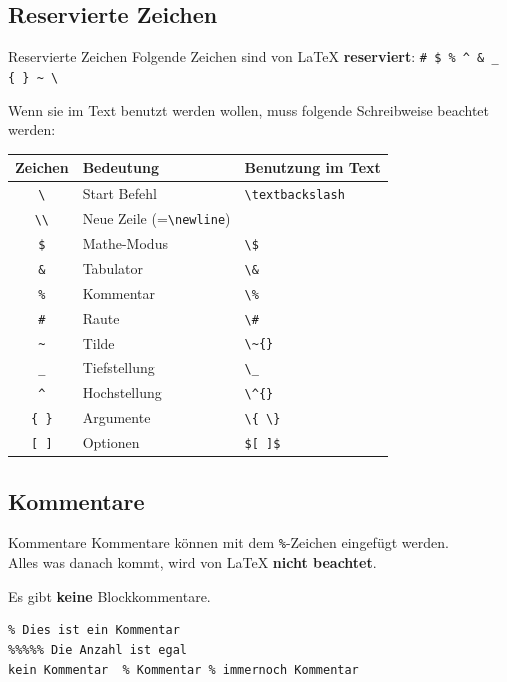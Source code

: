 \documentclass[xcolor=dvipsnames]{beamer}
\begin{document}
\subsection{Reservierte Zeichen} \label{sub:reserved}
\begin{frame}[fragile]{Reservierte Zeichen}
Folgende Zeichen sind von \LaTeX{} \textbf{reserviert}: \texttt{\# \$ \% \^{} \& \_ \{ \} \~{} \textbackslash{}} \par\medskip
Wenn sie im Text benutzt werden wollen, muss folgende Schreibweise beachtet werden: \par\medskip
{\footnotesize
\begin{tabular}{|c|l|l|}
\hline
Zeichen & Bedeutung & Benutzung im Text \\
\hline
\texttt{\textbackslash} & Start Befehl & \verb|\textbackslash| \\
\texttt{\textbackslash\textbackslash} & Neue Zeile (=\verb|\newline|) & \\
\texttt{\$} & Mathe-Modus & \verb|\$| \\
\texttt{\&} & Tabulator & \verb|\&| \\
\texttt{\%} & Kommentar & \verb|\%| \\
\texttt{\#} & Raute & \verb|\#| \\
\texttt{\~{}} & Tilde & \verb|\~{}| \\
\texttt{\_} & Tiefstellung & \verb|\_| \\
\texttt{\^{}} & Hochstellung & \verb|\^{}| \\
\texttt{\{ \}} & Argumente & \verb|\{ \}| \\
\texttt{[ ]} & Optionen & \verb|$[ ]$| \\ \hline
\end{tabular} 
}
\end{frame}


\subsection{Kommentare}
\begin{frame}[fragile]{Kommentare}
Kommentare können mit dem \texttt{\%}-Zeichen eingefügt werden. \\
Alles was danach kommt, wird von \LaTeX{} \textbf{nicht beachtet}. \par\medskip
Es gibt \textbf{keine} Blockkommentare. \par\medskip
\begin{lstlisting}
% Dies ist ein Kommentar
%%%%% Die Anzahl ist egal
kein Kommentar	% Kommentar % immernoch Kommentar
\end{lstlisting}
\end{frame}
\end{document}
